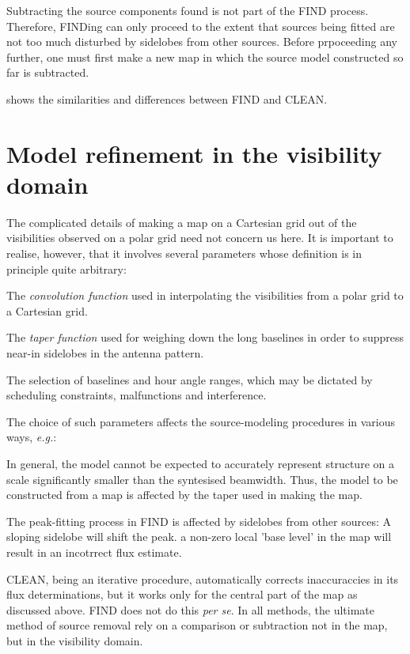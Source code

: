 	Subtracting the source components found is not part of the FIND
process. Therefore, FINDing can only proceed to the extent that sources being
fitted are not too much disturbed by sidelobes from other sources. Before
prpoceeding any further, one must first make a new map in which the source
model constructed so far is subtracted.

	 shows the similarities and differences between
FIND and CLEAN.


\section{ Model refinement in the visibility domain }
\label{.model.refine}

	The complicated details of making a map on a Cartesian grid out of the
visibilities observed on a polar grid need not concern us here. It is important
to realise, however, that it involves several parameters whose definition is in
principle quite arbitrary:

\bi
\item   The {\em convolution function} used in interpolating the visibilities
from a polar grid to a Cartesian grid.

\item   The {\em taper function} used for weighing down the long baselines in
order to suppress near-in sidelobes in the antenna pattern.

\item   The selection of baselines and hour angle ranges, which may be dictated
by scheduling constraints, malfunctions and interference.
\ei

	The choice of such parameters affects the source-modeling procedures in
various ways, {\em e.g.}:

\bi
\item   In general, the model cannot be expected to accurately represent
structure on a scale significantly smaller than the syntesised beamwidth. Thus,
the model to be constructed from a map is affected by the taper used in making
the map.

\item   The peak-fitting process in FIND is affected by sidelobes from other
sources: A sloping sidelobe will shift the peak. a non-zero local 'base level'
in the map will result in an incotrrect flux estimate.
\ei

	CLEAN, being an iterative procedure, automatically corrects
inaccuraccies in its flux determinations, but it works only for the central
part of the map as discussed above. FIND does not do this {\em per se}. In all
methods, the ultimate method of source removal rely on a comparison or
subtraction not in the map, but in the visibility domain.


